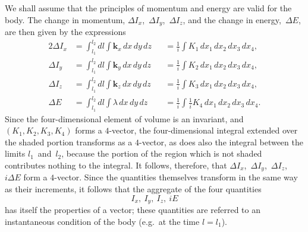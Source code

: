 \documentclass[12pt]{book}[2005/09/16]
\newcommand{\Change}[2]{#2}
\newcommand{\Add}[1]{\Change{}{#1}}
\newcommand{\PageSep}[1]{\ignorespaces}
\newcommand{\Vector}[1]{\mathbf{#1}}
\newcommand{\veci}{\Vector{i}}
\renewcommand{\k}{\Vector{k}}
\begin{document}
We shall assume that the principles of momentum
and energy are valid for the body. The change in
momentum, $\Delta I_{x}$,~$\Delta I_{y}$,~$\Delta I_{z}$, and the change in energy,~$\Delta E$,
are then given by the expressions
\begin{alignat*}{2}
\Delta I_{x} &= \int_{l_{1}}^{l_{2}}dl \int \k_{x}\, dx\, dy\, dz
  &&= \frac{1}{\Change{\veci}{i}}\int K_{1}\, dx_{1}\, dx_{2}\, dx_{3}\, dx_{4}\Add{,} \\
%
\Delta I_{y} &= \int_{l_{1}}^{l_{2}}dl \int \k_{y}\, dx\, dy\, dz
  &&= \frac{1}{\Change{\veci}{i}}\int K_{2}\, dx_{1}\, dx_{2}\, dx_{3}\, dx_{4}\Add{,} \\
%
\Delta I_{z} &= \int_{l_{1}}^{l_{2}}dl \int \k_{z}\, dx\, dy\, dz
  &&= \frac{1}{\Change{\veci}{i}}\int K_{3}\, dx_{1}\, dx_{2}\, dx_{3}\, dx_{4}\Add{,} \\
%
\Delta E &= \int_{l_{1}}^{l_{2}}dl \int \lambda\, dx\, dy\, dz
  &&= \frac{1}{\Change{\veci}{i}}\int
      \frac{1}{\Change{\veci}{i}}K_{4}\, dx_{1}\, dx_{2}\, dx_{3}\, dx_{4}\Add{.}
\end{alignat*}
\PageSep{49}
Since the four-dimensional element of volume is an
invariant, and $(K_{1}, K_{2}, K_{3}, K_{4})$ forms a $4$-vector, the four-dimensional
integral extended over the shaded portion
transforms as a $4$-vector, as does also the integral between
the limits $l_{1}$~and~$l_{2}$, because the portion of the region which
is not shaded contributes nothing to the integral. It
follows, therefore, that $\Delta I_{x}$,~$\Delta I_{y}$,~$\Delta I_{z}$,~$i\Delta E$ form a $4$-vector.
Since the quantities themselves transform in the same
way as their increments, it follows that the aggregate of
the four quantities
\[
I_{x},\ I_{y},\ I_{z},\ \Change{\veci}{i} E
\]
has itself the properties of a vector; these quantities are
referred to an instantaneous condition of the body (e.g.~at
the time $l = l_{1}$).
\end{document}
